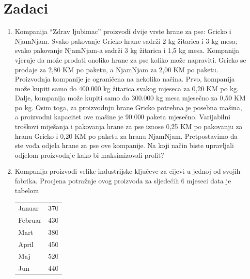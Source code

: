 \documentclass[a4paper, utf8, 11pt, colorlinks]{book}
\theoremstyle{definition}
\begin{document}
\section{Zadaci}
\begin{enumerate}
	\item  Kompanija ``Zdrav ljubimac'' proizvodi dvije vrste hrane za pse: Gricko i NjamNjam. Svako pakovanje Gricko hrane sadrži 2 kg žitarica i 3 kg mesa; svako pakovanje NjamNjam-a sadrži 3 kg žitarica i 1,5 kg mesa. Kompanija vjeruje da može prodati onoliko hrane za pse koliko može napraviti. Gricko se prodaje za   2,80 KM po paketu, a NjamNjam  za 2,00 KM po paketu. Proizvodnja kompanije je ograničena na nekoliko načina. Prvo, kompanija može kupiti samo do 400.000 kg žitarica svakog mjeseca za 0,20 KM po kg. Dalje, kompanija može
	kupiti samo do 300.000 kg mesa mjesečno za 0,50 KM po kg. Osim toga, za proizvodnju hrane Gricko  potrebna je posebna mašina, a proizvodni kapacitet ove mašine je 90.000 paketa mjesečno. Varijabilni troškovi miješanja i pakovanja hrane za pse iznose 0,25 KM po pakovanju za hranu Gricko i 0,20 KM po paketu za hranu NjamNjam.  
	Pretpostavimo da ste vođa odjela hrane za pse  ove kompanije. Na koji način biste  upravljali odjelom proizvodnje kako bi maksimizovali profit? 
	\item %
	 Kompanija proizvodi velike industrijske ključeve za cijevi u jednoj od svojih fabrika. 
	 Procjena potražnje ovog proizvoda za sljedećih 6 mjeseci data je tabelom
 \begin{center}
    \begin{tabular}{lc}\hline
		 Januar  & 370 \\
		 Februar & 430 \\
		 Mart    & 380 \\
		 April   & 450 \\
		 Maj     & 520 \\
		 Jun     & 440 \\
		 \hline
	\end{tabular}  
\end{center}	
	

\end{enumerate}
\end{document}
